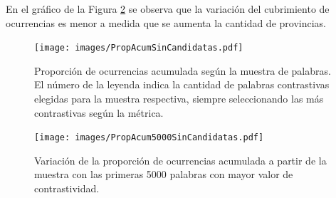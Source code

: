 En el gráfico de la Figura \ref{fig:propAcum5000} se observa que la variación del cubrimiento de ocurrencias es menor a medida que se aumenta la cantidad de provincias. 


\begin{figure}\centering
    \texttt{[image: images/PropAcumSinCandidatas.pdf]}
    \caption{Proporción de ocurrencias acumulada según la muestra de palabras. El número de la leyenda indica la cantidad de palabras contrastivas elegidas para la muestra respectiva, siempre seleccionando las más contrastivas según la métrica.} 
    \label{fig:propAcum} 
\end{figure}


\begin{figure}[ht]\centering
    \texttt{[image: images/PropAcum5000SinCandidatas.pdf]}
    \caption{Variación de la proporción de ocurrencias acumulada a partir de la muestra con las primeras 5000 palabras con mayor valor de contrastividad.} 
    \label{fig:propAcum5000} 
\end{figure}

